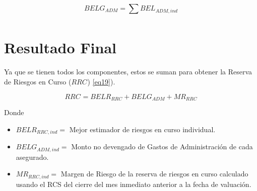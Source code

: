 \documentclass[11pt,twoside,openright,spanish]{report}
\numberwithin{equation}{chapter}
\numberwithin{figure}{chapter}
\numberwithin{table}{chapter}
\begin{document}
\begin{equation}
	BELG_{ADM}=\sum _{}^{}BEL_{ADM,ind}^{}
	\label{eq11}
\end{equation}

	
\section{Resultado Final}


Ya que se tienen todos los componentes, estos se suman para obtener la Reserva de Riesgos en Curso ($RRC_{}$) \ref{eq19}).

\begin{equation}
	{RRC}_{}^{}={{BELR}_{RRC}+BELG_{ADM} +MR_{RRC}
	}
	\label{eq19}
\end{equation}	

Donde

\begin{itemize}
	\setlength\itemsep{-0.5em}
	\item $BELR_{RRC,ind}=$ Mejor estimador de riesgos en curso individual.
	
	\item $BELG_{ADM,ind}^{}=$ Monto no devengado de Gastos de Administración de cada asegurado.
	
	\item $MR_{RRC,ind}^{}=$ Margen de Riesgo de la reserva de riesgos en curso calculado usando el RCS del cierre del mes inmediato anterior a la fecha de valuación.
\end{itemize}

\end{document}
